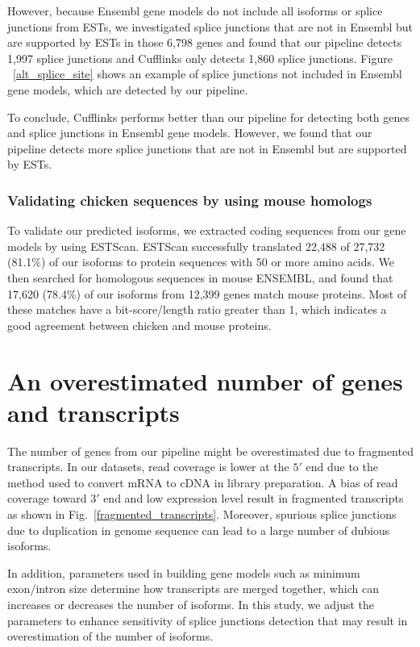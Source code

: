 \documentclass[10pt]{article}
\begin{document}
However, because Ensembl gene models do not include all isoforms or
splice junctions from ESTs, we investigated splice junctions that are
not in Ensembl but are supported by ESTs in those 6,798 genes and
found that our pipeline detects 1,997 splice junctions and Cufflinks
only detects 1,860 splice junctions.
Figure ~\ref{alt_splice_site} shows an example of splice junctions not
included in Ensembl gene models, which are detected by our pipeline.

To conclude, Cufflinks performs better than our pipeline for detecting
both genes and splice junctions in Ensembl gene models.
However, we found that our pipeline detects more splice junctions
that are not in Ensembl but are supported by ESTs.

\subsubsection*{Validating chicken sequences by using mouse homologs}

To validate our predicted isoforms, we extracted coding sequences from
our gene models by using ESTScan\cite{Iseli:1999vd}.  ESTScan
successfully translated 22,488 of 27,732 (81.1\%) of our isoforms to
protein sequences with 50 or more amino acids.  We then searched for
homologous sequences in mouse ENSEMBL, and found that 17,620 (78.4\%)
of our isoforms from 12,399 genes match mouse proteins.
Most of these matches have a bit-score/length ratio greater than 1,
which indicates a good agreement between chicken and mouse proteins.

\section*{An overestimated number of genes and transcripts}

The number of genes from our pipeline might be overestimated due to
fragmented transcripts.  In our datasets, read coverage is lower at
the $5'$ end due to the method used to convert mRNA to cDNA in library
preparation.  A bias of read coverage toward $3'$ end and low
expression level result in fragmented transcripts as shown in
Fig.~\ref{fragmented_transcripts}.  Moreover, spurious splice
junctions due to duplication in genome sequence can lead to a large
number of dubious isoforms. 

In addition, parameters used in building gene models such as minimum
exon/intron size determine how transcripts are merged together, which
can increases or decreases the number of isoforms.  In this study, we
adjust the parameters to enhance sensitivity of splice junctions
detection that may result in overestimation of the number of isoforms.
\end{document}
